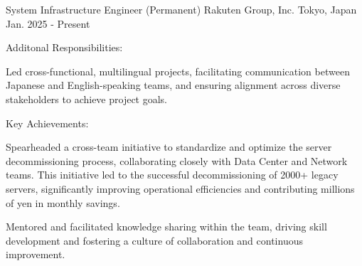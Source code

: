 

\begin{cventries}

  \cventry
    {System Infrastructure Engineer (Permanent)} %
    {Rakuten Group, Inc.} %
    {Tokyo, Japan} %
    {Jan. 2025 - Present} %
    {
      Additonal Responsibilities:
      \begin{cvbullets}
        \item Led cross-functional, multilingual projects, facilitating communication between Japanese and English-speaking teams, and ensuring alignment across diverse stakeholders to achieve project goals.
      \end{cvbullets}
      Key Achievements:
      \begin{cvbullets}
        \item Spearheaded a cross-team initiative to standardize and optimize the server decommissioning process, collaborating closely with Data Center and Network teams. This initiative led to the successful decommissioning of 2000+ legacy servers, significantly improving operational efficiencies and contributing millions of yen in monthly savings.
        \item Mentored and facilitated knowledge sharing within the team, driving skill development and fostering a culture of collaboration and continuous improvement.
      \end{cvbullets}
    }
  

\end{cventries}
